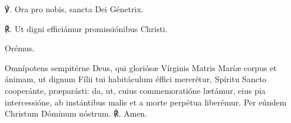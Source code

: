 ℣. Ora pro nobis, sancta Dei Génetrix.

℟. Ut digni efficiámur promissiónibus Christi.

Orémus.

Omnípotens sempitérne Deus, qui gloriósæ Vírginis Matris Maríæ corpus et ánimam, ut dignum Fílii tui habitáculum éffici mererétur, Spíritu Sancto cooperánte, præparásti: da, ut, cuius commemoratióne lætámur, eius pia intercessióne, ab instántibus malis et a morte perpétua liberémur. Per eúndem Christum Dóminum nóstrum.  ℟. Amen.